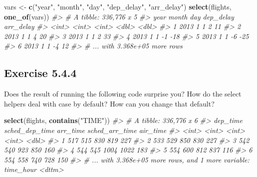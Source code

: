 \documentclass[]{book}
\newenvironment{Shaded}{\begin{snugshade}}{\end{snugshade}}
\newcommand{\CommentTok}[1]{\textcolor[rgb]{0.56,0.35,0.01}{\textit{#1}}}
\newcommand{\KeywordTok}[1]{\textcolor[rgb]{0.13,0.29,0.53}{\textbf{#1}}}
\newcommand{\NormalTok}[1]{#1}
\newcommand{\StringTok}[1]{\textcolor[rgb]{0.31,0.60,0.02}{#1}}
\theoremstyle{plain}
\theoremstyle{remark}
\theoremstyle{definition}
\theoremstyle{definition}
\theoremstyle{definition}
\theoremstyle{remark}
\begin{document}
\begin{Shaded}
\begin{Highlighting}[]
\NormalTok{vars <-}\StringTok{ }\KeywordTok{c}\NormalTok{(}\StringTok{"year"}\NormalTok{, }\StringTok{"month"}\NormalTok{, }\StringTok{"day"}\NormalTok{, }\StringTok{"dep_delay"}\NormalTok{, }\StringTok{"arr_delay"}\NormalTok{)}
\KeywordTok{select}\NormalTok{(flights, }\KeywordTok{one_of}\NormalTok{(vars))}
\CommentTok{#> # A tibble: 336,776 x 5}
\CommentTok{#>    year month   day dep_delay arr_delay}
\CommentTok{#>   <int> <int> <int>     <dbl>     <dbl>}
\CommentTok{#> 1  2013     1     1         2        11}
\CommentTok{#> 2  2013     1     1         4        20}
\CommentTok{#> 3  2013     1     1         2        33}
\CommentTok{#> 4  2013     1     1        -1       -18}
\CommentTok{#> 5  2013     1     1        -6       -25}
\CommentTok{#> 6  2013     1     1        -4        12}
\CommentTok{#> # ... with 3.368e+05 more rows}
\end{Highlighting}
\end{Shaded}

\hypertarget{exercise-5.4.4}{%
\subsection*{\texorpdfstring{Exercise
{5.4.4}}{Exercise 5.4.4}}\label{exercise-5.4.4}}

Does the result of running the following code surprise you? How do the
select helpers deal with case by default? How can you change that
default?

\begin{Shaded}
\begin{Highlighting}[]
\KeywordTok{select}\NormalTok{(flights, }\KeywordTok{contains}\NormalTok{(}\StringTok{"TIME"}\NormalTok{))}
\CommentTok{#> # A tibble: 336,776 x 6}
\CommentTok{#>   dep_time sched_dep_time arr_time sched_arr_time air_time}
\CommentTok{#>      <int>          <int>    <int>          <int>    <dbl>}
\CommentTok{#> 1      517            515      830            819      227}
\CommentTok{#> 2      533            529      850            830      227}
\CommentTok{#> 3      542            540      923            850      160}
\CommentTok{#> 4      544            545     1004           1022      183}
\CommentTok{#> 5      554            600      812            837      116}
\CommentTok{#> 6      554            558      740            728      150}
\CommentTok{#> # ... with 3.368e+05 more rows, and 1 more variable: time_hour <dttm>}
\end{Highlighting}
\end{Shaded}
\end{document}

